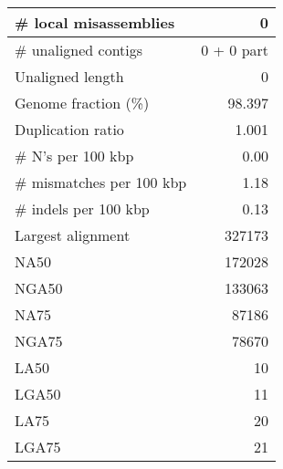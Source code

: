 \documentclass[12pt,a4paper]{article}
\begin{document}
\begin{table}[ht]
\begin{center}
\begin{tabular}{|l*{1}{|r}|}
\# local misassemblies & 0 \\ \hline
\# unaligned contigs & 0 + 0 part \\ \hline
Unaligned length & 0 \\ \hline
Genome fraction (\%) & 98.397 \\ \hline
Duplication ratio & 1.001 \\ \hline
\# N's per 100 kbp & 0.00 \\ \hline
\# mismatches per 100 kbp & 1.18 \\ \hline
\# indels per 100 kbp & 0.13 \\ \hline
Largest alignment & 327173 \\ \hline
NA50 & 172028 \\ \hline
NGA50 & 133063 \\ \hline
NA75 & 87186 \\ \hline
NGA75 & 78670 \\ \hline
LA50 & 10 \\ \hline
LGA50 & 11 \\ \hline
LA75 & 20 \\ \hline
LGA75 & 21 \\ \hline
\end{tabular}
\end{center}
\end{table}
\end{document}
